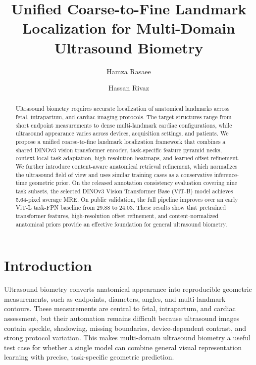 \documentclass[runningheads]{llncs}
\title{Unified Coarse-to-Fine Landmark Localization for Multi-Domain Ultrasound Biometry}
\author{
Hamza Rasaee\inst{1}
\and
Hassan Rivaz\inst{1}
}
\institute{
Department of Electrical and Computer Engineering, Concordia University, Montreal, Canada\\
\email{\{hamza.rasaee,hassan.rivaz\}@concordia.ca}
}
\begin{document}
\maketitle

\begin{abstract}
\noindent Ultrasound biometry requires accurate localization of anatomical landmarks across fetal, intrapartum, and cardiac imaging protocols. The target structures range from short endpoint measurements to dense multi-landmark cardiac configurations, while ultrasound appearance varies across devices, acquisition settings, and patients. We propose a unified coarse-to-fine landmark localization framework that combines a shared DINOv3 vision transformer encoder, task-specific feature pyramid necks, context-local task adaptation, high-resolution heatmaps, and learned offset refinement. We further introduce content-aware anatomical retrieval refinement, which normalizes the ultrasound field of view and uses similar training cases as a conservative inference-time geometric prior. On the released annotation consistency evaluation covering nine task subsets, the selected DINOv3 Vision Transformer Base (ViT-B) model achieves 5.64-pixel average MRE. On public validation, the full pipeline improves over an early ViT-L task-FPN baseline from 29.88 to 24.03. These results show that pretrained transformer features, high-resolution offset refinement, and content-normalized anatomical priors provide an effective foundation for general ultrasound biometry.

\end{abstract}

\section{Introduction}
Ultrasound biometry converts anatomical appearance into reproducible geometric measurements, such as endpoints, diameters, angles, and multi-landmark contours. These measurements are central to fetal, intrapartum, and cardiac assessment, but their automation remains difficult because ultrasound images contain speckle, shadowing, missing boundaries, device-dependent contrast, and strong protocol variation. This makes multi-domain ultrasound biometry a useful test case for whether a single model can combine general visual representation learning with precise, task-specific geometric prediction.
\end{document}
